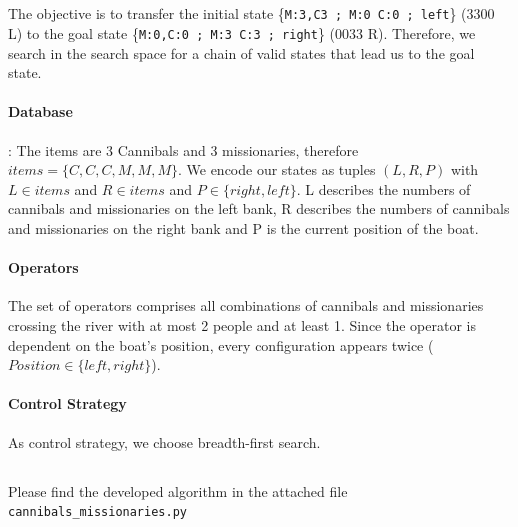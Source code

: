 \documentclass[11pt]{article}
\begin{document}
\subsection{}
The objective is to transfer the initial state \{\texttt{M:3,C3 ; M:0 C:0 ; left}\} (3300 L) to the goal state \{\texttt{M:0,C:0 ; M:3 C:3 ; right}\} (0033 R). Therefore, we search in the search space for a chain of valid states that lead us to the goal state.
\paragraph{Database}: The items are 3 Cannibals and 3 missionaries, therefore $items = \{C,C,C,M,M,M\}$. We encode our states as tuples $(L,R,P)$ with $L \in items$ and $R \in items$ and $P \in \{right,left\}$. L describes the numbers of cannibals and missionaries on the left bank, R describes the numbers of cannibals and missionaries on the right bank and P is the current position of the boat.

\paragraph{Operators} The set of operators comprises all combinations of cannibals and missionaries crossing the river with at most 2 people and at least 1. Since the operator is dependent on the boat's position, every configuration appears twice ($Position \in \{left,right\}$). 

\paragraph{Control Strategy}
As control strategy, we choose breadth-first search.

\subsection{}
Please find the developed algorithm in the attached file \texttt{cannibals\_missionaries.py}
\end{document}
